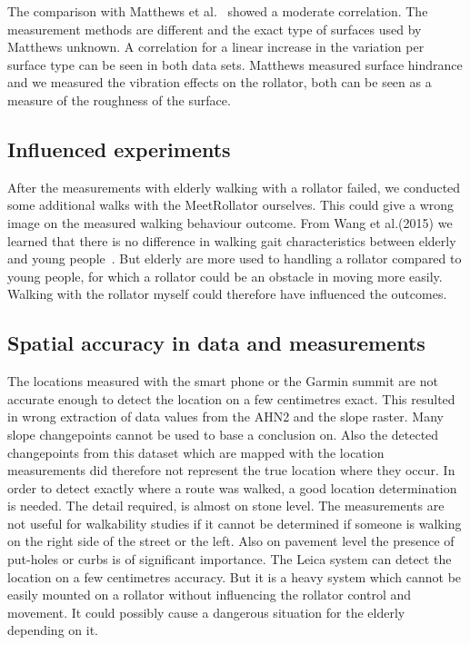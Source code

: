 The comparison with Matthews et al.~\cite{Matthews2003} showed a moderate correlation. The measurement methods are different and the exact type of surfaces used by Matthews unknown. A correlation for a linear increase in the variation per surface type can be seen in both data sets. Matthews measured surface hindrance and we measured the vibration effects on the rollator, both can be seen as a measure of the roughness of the surface. 

\subsection{Influenced experiments}
After the measurements with elderly walking with a rollator failed, we conducted some additional walks with the MeetRollator ourselves. This could give a wrong image on the measured walking behaviour outcome. From Wang et al.(2015) we learned that there is no difference in walking gait characteristics between elderly and young people~\cite{Wang2015}. But elderly are more used to handling a rollator compared to young people, for which a rollator could be an obstacle in moving more easily. Walking with the rollator myself could therefore have influenced the outcomes. 

\subsection{Spatial accuracy in data and measurements}
The locations measured with the smart phone or the Garmin summit are not accurate enough to detect the location on a few centimetres exact. This resulted in wrong extraction of data values from the AHN2 and the slope raster. Many slope changepoints cannot be used to base a conclusion on. Also the detected changepoints from this dataset which are mapped with the location measurements did therefore not represent the true location where they occur. 
 In order to detect exactly where a route was walked, a good location determination is needed. The detail required, is almost on stone level. The measurements are not useful for walkability studies if it cannot be determined if someone is walking on the right side of the street or the left. Also on pavement level the presence of put-holes or curbs is of significant importance. The Leica system can detect the location on a few centimetres accuracy. But it is a heavy system which cannot be easily mounted on a rollator without influencing the rollator control and movement. It could possibly cause a dangerous situation for the elderly depending on it. 

